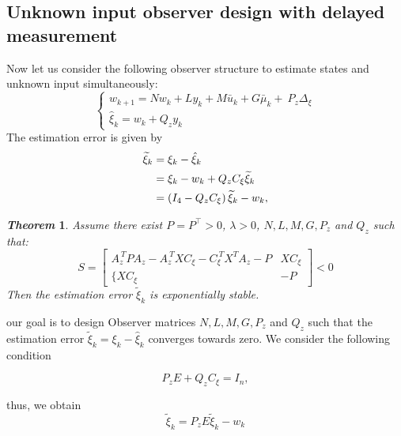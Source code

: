 \documentclass[letterpaper, 10 pt, conference]{ieeeconf}  %
\newtheorem{theorem}{\it Theorem}%
\begin{document}


\subsection{Unknown input observer design with delayed measurement}

Now let us consider the following observer structure to estimate states and unknown input simultaneously:
\begin{equation}
    \left\{\begin{array}{c}
        w_{k+1}=N w_{k}+L y_{k}+M\bar{u}_{k}+G\bar{\mu}_{k}+\ P_{z}\Delta_{\xi}\\ \hat{\xi}_{k}=w_{k}+Q_{z}y_{k}
    \end{array}\right.
\end{equation}
The estimation error is given by
\begin{align}\label{est_error}
    {\widetilde\xi}_{k}&={\xi}_{k}-{\hat{\xi}}_{k} \notag\\
    &={\xi}_{k}-w_{k}+Q_{z}C_{\xi}{\widetilde\xi}_{k} \notag\\
    &=\left(I_{4}-Q_{z}C_{\xi}\right){\widetilde\xi}_{k}-w_{k},
\end{align}

\begin{theorem}
    Assume there exist $P = P^\top > 0$, $\lambda > 0$,  $N, L, M, G, P_{z}$ and $Q_z$ such that:
\begin{equation}\label{LMI}
    S =\begin{bmatrix}
   A_{z}^{\ T}P A_{z}-A_{z}^{\ T}X C_{\xi}-C_{\xi}^{\ T}X^{T}A_{z}-P & X C_{\xi}
   \\ {{\{X C_{\xi}}}&{{-P}}     
    \end{bmatrix}<0
\end{equation}
Then the estimation error ${\widetilde\xi}_{k}$ is exponentially stable.
\end{theorem}

    

 our goal is to design Observer matrices $N, L, M, G, P_{z}$ and $Q_z$ such that the estimation error ${\widetilde\xi}_{k}={\xi}_{k}-{\hat{\xi}}_{k}$ converges towards zero.
We consider the following condition

\begin{equation}\label{CO_PEQC}
    P_{z}E+Q_{z}C_{\xi}=I_{n},
\end{equation}

thus, we obtain \\
\begin{equation}
    \widetilde\xi_{k}=P_{z}E\widetilde\xi_{k}-w_{k}
\end{equation}
\end{document}
